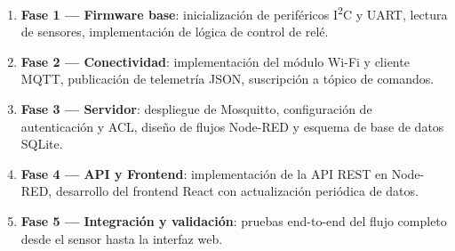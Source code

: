 \begin{enumerate}
  \item \textbf{Fase 1 — Firmware base}: inicialización de periféricos I\textsuperscript{2}C
        y UART, lectura de sensores, implementación de lógica de control de relé.
  \item \textbf{Fase 2 — Conectividad}: implementación del módulo Wi-Fi y cliente MQTT,
        publicación de telemetría JSON, suscripción a tópico de comandos.
  \item \textbf{Fase 3 — Servidor}: despliegue de Mosquitto, configuración de autenticación
        y ACL, diseño de flujos Node-RED y esquema de base de datos SQLite.
  \item \textbf{Fase 4 — API y Frontend}: implementación de la API REST en Node-RED,
        desarrollo del frontend React con actualización periódica de datos.
  \item \textbf{Fase 5 — Integración y validación}: pruebas end-to-end del flujo completo
        desde el sensor hasta la interfaz web.
\end{enumerate}

